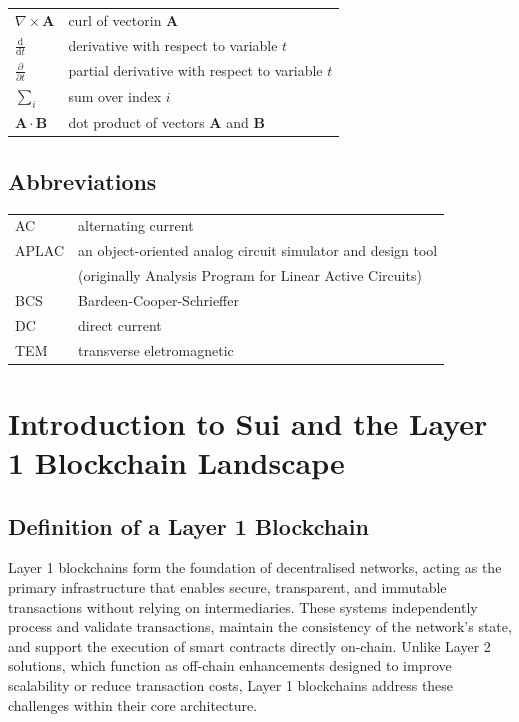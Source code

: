 \documentclass[english, 12pt, a4paper, biz, utf8, a-2b, online]{aaltothesis}
\begin{document}
\begin{tabular}{ll}
$\nabla \times \mathbf{A}$              & curl of vectorin $\mathbf{A}$\\
$\displaystyle\frac{\mbox{d}}{\mbox{d} t}$ & derivative with respect to 
variable $t$\\[3mm]
$\displaystyle\frac{\partial}{\partial t}$  & partial derivative with respect 
to variable $t$ \\[3mm]
$\sum_i $                       & sum over index $i$\\
$\mathbf{A} \cdot \mathbf{B}$    & dot product of vectors $\mathbf{A}$ and 
$\mathbf{B}$
\end{tabular}

\subsection*{Abbreviations}

\begin{tabular}{ll}
AC         & alternating current \\
APLAC      & an object-oriented analog circuit simulator and design tool \\
           & (originally Analysis Program for Linear Active Circuits) \\
BCS        & Bardeen-Cooper-Schrieffer \\ %
DC         & direct current \\
TEM        & transverse eletromagnetic
\end{tabular}


\cleardoublepage

\section{Introduction to Sui and the Layer 1 Blockchain Landscape}

\subsection{Definition of a Layer 1 Blockchain}
Layer 1 blockchains form the foundation of decentralised networks, acting as the primary infrastructure that enables secure, transparent, and immutable transactions without relying on intermediaries. These systems independently process and validate transactions, maintain the consistency of the network’s state, and support the execution of smart contracts directly on-chain. Unlike Layer 2 solutions, which function as off-chain enhancements designed to improve scalability or reduce transaction costs, Layer 1 blockchains address these challenges within their core architecture.
\end{document}
